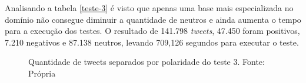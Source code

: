 \begin{table}[]
	\caption{3º teste}
	\label{teste-3}
\end{table}

Analisando a tabela \ref{teste-3} é visto que apenas uma base mais especializada no domínio não consegue diminuir a quantidade de neutros e ainda aumenta o tempo para a execução dos testes. O resultado de 141.798 \textit{tweets}, 47.450 foram positivos, 7.210 negativos e 87.138 neutros, levando 709,126 segundos para executar o teste.

\begin{figure}[!h]
	\centering{}
	\caption{Quantidade de tweets separados por polaridade do teste 3. Fonte: Própria}
	\label{teste-graf-3}
\end{figure}

